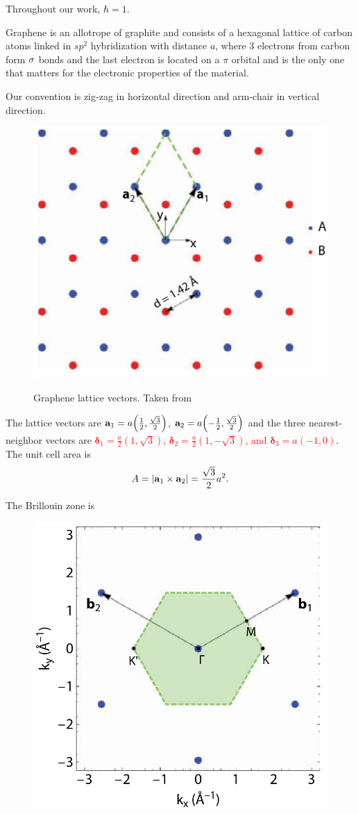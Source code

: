 \documentclass[a4paper,10pt]{article}
\begin{document}
Throughout our work, $\hbar = 1$.

\n

Graphene is an allotrope of graphite and consists of a hexagonal lattice of carbon atoms linked in $sp^2$ hybridization with distance $a$, where $3$ electrons from carbon form $\sigma$ bonds and the last electron is located on a $\pi$ orbital and is the only one that matters for the electronic properties of the material.

\n

Our convention is zig-zag in horizontal direction and arm-chair in vertical direction.

\begin{figure}[H]
\centering
\includegraphics[width=0.4\linewidth]{fig/graphene-lattice_vectors2.png}
\label{fig:graphene-lattice_vectors}
\caption{Graphene lattice vectors. Taken from \cite{handbook2019}}
\end{figure}

The lattice vectors are $\vb{a}_1 = a \qty(\frac{1}{2}, \frac{\sqrt{3}}{2})$, $\vb{a}_2 = a \qty(-\frac{1}{2}, \frac{\sqrt{3}}{2})$ and the three nearest-neighbor vectors are \textcolor{red}{$\bm{\delta}_1 = \frac{a}{2} (1, \sqrt{3})$, $\bm{\delta}_2 = \frac{a}{2} (1, -\sqrt{3})$, and $\bm{\delta}_3 = a (-1, 0)$}. The unit cell area is
$$
A = \abs{{\vb{a}}_1 \times {\vb{a}}_2} = \frac{\sqrt{3}}{2} a^2.
$$

The Brillouin zone is
\begin{figure}[H]
\centering
\includegraphics[width=0.3\linewidth]{fig/brillouin-zone-monolayer.png}
\caption{}
\label{fig:brillouin-zone-monolayer}
\end{figure}
\end{document}
